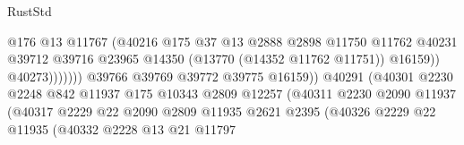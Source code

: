 \begin{lexlean}{RustStd}
\begin{coremodule}
                                                  @176
                                                  @13
                                                  @11767
                                                  (@40216
                                                    @175
                                                    @37
                                                    @13
                                                    @2888
                                                    @2898
                                                    @11750
                                                    @11762
                                                    @40231
                                                    @39712
                                                    @39716
                                                    @23965
                                                    @14350
                                                    (@13770 (@14352 @11762 @11751))
                                                    @16159))
                                                @40273)))))))
                                  @39766
                                  @39769
                                  @39772
                                  @39775
                                  @16159))
                              @40291
                              (@40301
                                @2230
                                @2248
                                @842
                                @11937
                                @175
                                @10343
                                @2809
                                @12257
                                (@40311
                                  @2230
                                  @2090
                                  @11937
                                  (@40317
                                    @2229
                                    @22
                                    @2090
                                    @2809
                                    @11935
                                    @2621
                                    @2395
                                    (@40326
                                      @2229
                                      @22
                                      @11935
                                      (@40332
                                        @2228
                                        @13
                                        @21
                                        @11797

\end{coremodule}
\end{lexlean}
